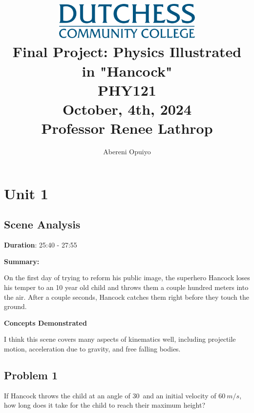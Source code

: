 \documentclass[a4paper,12pt]{article}
\title{
    \vspace{5cm} %
    \includegraphics[width=0.55\textwidth]{dutchess-logo-blue.png} \\ %
    \vspace{1cm} %
    \textbf{\Huge Final Project: Physics Illustrated in "Hancock"} \\
    \vspace{1cm} %
    \large PHY121 \\
    \vspace{0.5cm} %
    \large	October, 4th, 2024 \\ 
		\vspace{.5cm}
		\large Professor Renee Lathrop 
}
\author{Abereni Opuiyo}
\date{}
\begin{document}
\maketitle
	\thispagestyle{plain}
\newpage




\setcounter{secnumdepth}{0}
\setcounter{page}{1}  %
\tableofcontents
\thispagestyle{fancy}
\newpage

\section{Unit 1}

\vspace{-0.5cm}
\singlespacing

\subsection{Scene Analysis}

\textbf{Duration}: 25:40 - 27:55

\vspace{0.3cm}
\noindent\textbf{Summary:} \par
On the first day of trying to reform his public image, the superhero Hancock loses his temper to an 10 year old child and throws them a couple hundred meters into the air. After a couple seconds, Hancock catches them right before they touch the ground. \par


\vspace{0.3cm}
\noindent\textbf{Concepts Demonstrated} \par
I think this scene covers many aspects of kinematics well, including projectile motion, acceleration due to gravity, and free falling bodies. 

\subsection{Problem 1}

If Hancock throws the child at an angle of 30\degree\ and an initial velocity of $60\ {m/s}$, how long does it take for the child to reach their maximum height?
\end{document}
